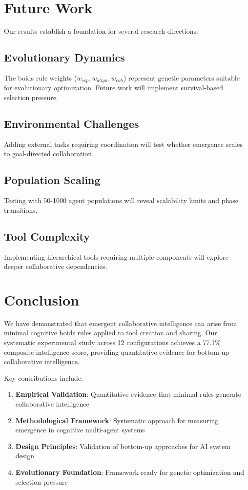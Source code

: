 \documentclass[10pt,twocolumn]{article}
\begin{document}
\section{Future Work}

Our results establish a foundation for several research directions:

\subsection{Evolutionary Dynamics}
The boids rule weights ($w_{sep}, w_{align}, w_{coh}$) represent genetic parameters suitable for evolutionary optimization. Future work will implement survival-based selection pressure.

\subsection{Environmental Challenges}
Adding external tasks requiring coordination will test whether emergence scales to goal-directed collaboration.

\subsection{Population Scaling}
Testing with 50-1000 agent populations will reveal scalability limits and phase transitions.

\subsection{Tool Complexity}
Implementing hierarchical tools requiring multiple components will explore deeper collaborative dependencies.

\section{Conclusion}

We have demonstrated that emergent collaborative intelligence can arise from minimal cognitive boids rules applied to tool creation and sharing. Our systematic experimental study across 12 configurations achieves a 77.1\% composite intelligence score, providing quantitative evidence for bottom-up collaborative intelligence.

Key contributions include:
\begin{enumerate}
\item \textbf{Empirical Validation}: Quantitative evidence that minimal rules generate collaborative intelligence
\item \textbf{Methodological Framework}: Systematic approach for measuring emergence in cognitive multi-agent systems  
\item \textbf{Design Principles}: Validation of bottom-up approaches for AI system design
\item \textbf{Evolutionary Foundation}: Framework ready for genetic optimization and selection pressure
\end{enumerate}
\end{document}
